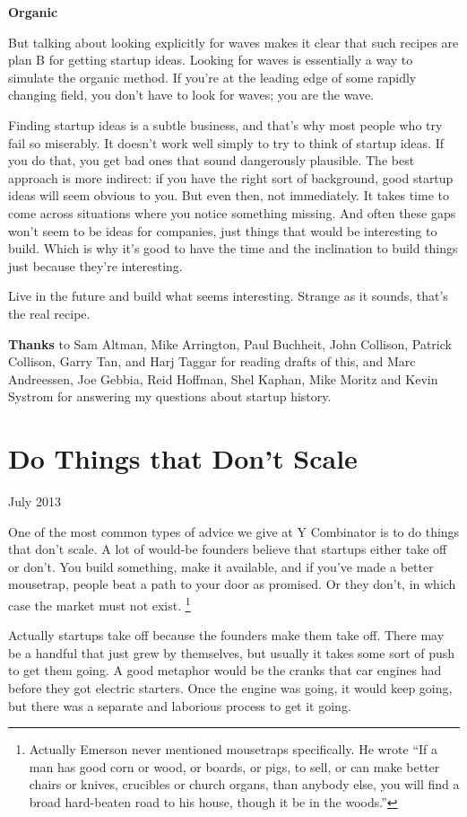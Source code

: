\documentclass[12pt]{book}
\begin{document}
\textbf{Organic}

But talking about looking explicitly for waves makes it clear that such
recipes are plan B for getting startup ideas. Looking for waves is
essentially a way to simulate the organic method. If you're at the
leading edge of some rapidly changing field, you don't have to look for
waves; you are the wave.

Finding startup ideas is a subtle business, and that's why most people
who try fail so miserably. It doesn't work well simply to try to think
of startup ideas. If you do that, you get bad ones that sound
dangerously plausible. The best approach is more indirect: if you have
the right sort of background, good startup ideas will seem obvious to
you. But even then, not immediately. It takes time to come across
situations where you notice something missing. And often these gaps
won't seem to be ideas for companies, just things that would be
interesting to build. Which is why it's good to have the time and the
inclination to build things just because they're interesting.

Live in the future and build what seems interesting. Strange as it
sounds, that's the real recipe.


\textbf{Thanks} to Sam Altman, Mike Arrington, Paul Buchheit, John
Collison, Patrick Collison, Garry Tan, and Harj Taggar for reading
drafts of this, and Marc Andreessen, Joe Gebbia, Reid Hoffman, Shel
Kaphan, Mike Moritz and Kevin Systrom for answering my questions about
startup history.
\chapter{Do Things that Don't Scale}

July 2013

One of the most common types of advice we give at Y Combinator is to do
things that don't scale. A lot of would-be founders believe that
startups either take off or don't. You build something, make it
available, and if you've made a better mousetrap, people beat a path to
your door as promised. Or they don't, in which case the market must not
exist. \footnote{Actually Emerson never mentioned mousetraps specifically. He
wrote ``If a man has good corn or wood, or boards, or pigs, to sell, or
can make better chairs or knives, crucibles or church organs, than
anybody else, you will find a broad hard-beaten road to his house,
though it be in the woods.''}

Actually startups take off because the founders make them take off.
There may be a handful that just grew by themselves, but usually it
takes some sort of push to get them going. A good metaphor would be the
cranks that car engines had before they got electric starters. Once the
engine was going, it would keep going, but there was a separate and
laborious process to get it going.
\end{document}
